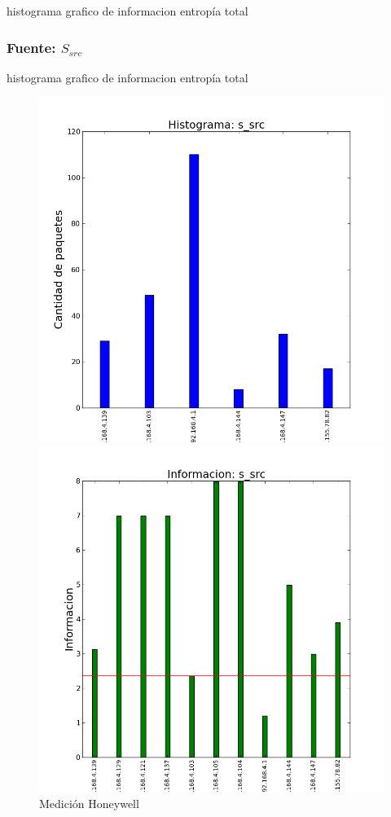 histograma
grafico de informacion
entropía total

\subsubsection{Fuente: $S_{src}$}

histograma
grafico de informacion
entropía total

\begin{figure}[H]
   \begin{minipage}{0.5\linewidth}
     \includegraphics[width=\linewidth]{../imgs/prueba_laburo-ips_s_src_hist.png}
     \caption{Medición Honeywell}\label{fig:Honeywell-src-hist}
   \end{minipage}
  \hfill
   \begin{minipage}{0.5\linewidth}
     \includegraphics[width=\linewidth]{../imgs/prueba_laburo-ips_s_src_info.png}

\end{minipage}
\end{figure}
